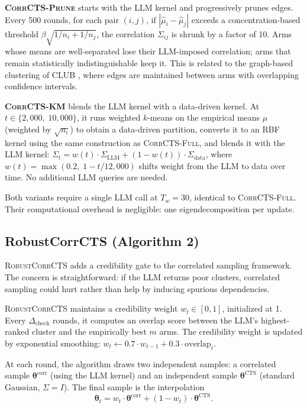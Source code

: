 \documentclass{article}
\theoremstyle{plain}
\theoremstyle{definition}
\theoremstyle{remark}
\newcommand{\CorrFull}{\textsc{CorrCTS-Full}}
\newcommand{\RobustCorr}{\textsc{RobustCorrCTS}}
\newcommand{\EdgePrune}{\textsc{CorrCTS-Prune}}
\newcommand{\KMRefine}{\textsc{CorrCTS-KM}}
\begin{document}
\textbf{\EdgePrune{}} starts with the LLM kernel and progressively prunes edges.
Every 500 rounds, for each pair $(i, j)$, if $|\hat\mu_i - \hat\mu_j|$ exceeds a concentration-based threshold $\beta\sqrt{1/n_i + 1/n_j}$, the correlation $\Sigma_{ij}$ is shrunk by a factor of 10.
Arms whose means are well-separated lose their LLM-imposed correlation; arms that remain statistically indistinguishable keep it.
This is related to the graph-based clustering of CLUB \citep{gentile2014online}, where edges are maintained between arms with overlapping confidence intervals.

\textbf{\KMRefine{}} blends the LLM kernel with a data-driven kernel.
At $t \in \{2{,}000,\; 10{,}000\}$, it runs weighted $k$-means on the empirical means $\hat\mu$ (weighted by $\sqrt{n_i}$) to obtain a data-driven partition, converts it to an RBF kernel using the same construction as \CorrFull{}, and blends it with the LLM kernel:
$\Sigma_t = w(t) \cdot \Sigma_{\text{LLM}} + (1 - w(t)) \cdot \Sigma_{\text{data}}$,
where $w(t) = \max(0.2,\; 1 - t/12{,}000)$ shifts weight from the LLM to data over time.
No additional LLM queries are needed.

Both variants require a single LLM call at $T_w = 30$, identical to \CorrFull{}.
Their computational overhead is negligible: one eigendecomposition per update.

\subsection{RobustCorrCTS (Algorithm 2)}\label{sec:n4}

\RobustCorr{} adds a credibility gate to the correlated sampling framework.
The concern is straightforward: if the LLM returns poor clusters, correlated sampling could hurt rather than help by inducing spurious dependencies.

\RobustCorr{} maintains a credibility weight $w_t \in [0,1]$, initialized at 1.
Every $\Delta_{\text{check}}$ rounds, it computes an overlap score between the LLM's highest-ranked cluster and the empirically best $m$ arms.
The credibility weight is updated by exponential smoothing: $w_t \gets 0.7 \cdot w_{t-1} + 0.3 \cdot \text{overlap}_t$.

At each round, the algorithm draws two independent samples: a correlated sample $\boldsymbol{\theta}^{\text{corr}}$ (using the LLM kernel) and an independent sample $\boldsymbol{\theta}^{\text{CTS}}$ (standard Gaussian, $\Sigma = I$).
The final sample is the interpolation
\begin{equation}\label{eq:interpolate}
  \boldsymbol{\theta}_t = w_t \cdot \boldsymbol{\theta}^{\text{corr}} + (1 - w_t) \cdot \boldsymbol{\theta}^{\text{CTS}}.
\end{equation}
\end{document}
